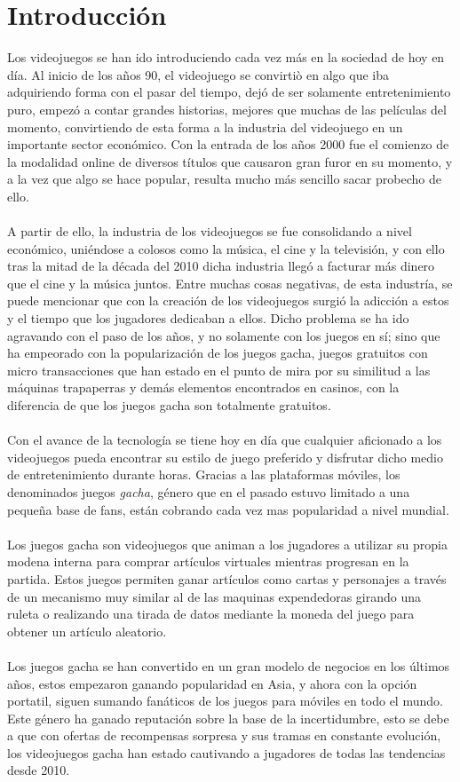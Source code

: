 \documentclass[osajnl,twocolumn,showpacs,superscriptaddress,10pt]{revtex4-2}
\begin{document}
\section{Introducción}
Los videojuegos se han ido introduciendo cada vez más en la sociedad de hoy en día. Al inicio de los años 90, el videojuego se convirtiò en algo que iba adquiriendo forma con el pasar del tiempo, dejó de ser solamente entretenimiento puro, empezó a contar grandes historias, mejores que muchas de las películas del momento, convirtiendo de esta forma a la industria del videojuego en un importante sector económico. Con la entrada de los años 2000 fue el comienzo de la modalidad online de diversos títulos que causaron gran furor en su momento, y a la vez que algo se hace popular, resulta mucho más sencillo sacar probecho de ello.
\\\\
A partir de ello, la industria de los videojuegos se fue consolidando a nivel económico, uniéndose a colosos como la música, el cine y la televisión, y con ello tras la mitad de la década del 2010 dicha industria llegó a facturar más dinero que el cine y la música juntos\cite{ONTSI}. Entre muchas cosas negativas, de esta industría, se puede mencionar que con la creación de los videojuegos surgió la adicción a estos y el tiempo que los jugadores dedicaban a ellos. Dicho problema se ha ido agravando con el paso de los años, y no solamente con los juegos en sí; sino que ha empeorado con la popularización de los juegos gacha, juegos gratuitos con micro transacciones que han estado en el punto de mira por su similitud a las máquinas trapaperras y demás elementos encontrados en casinos, con la diferencia de que los juegos gacha son totalmente gratuitos\cite{Navarro}.
\\\\
Con el avance de la tecnología se tiene hoy en día que cualquier aficionado a los videojuegos pueda encontrar su estilo de juego preferido y disfrutar dicho medio de entretenimiento durante horas. Gracias a las plataformas móviles, los denominados juegos \textit{gacha}, género que en el pasado estuvo limitado a una pequeña base de fans, están cobrando cada vez mas popularidad a nivel mundial.
\\\\
Los juegos gacha son videojuegos que animan a los jugadores a utilizar su propia modena interna para comprar artículos virtuales mientras progresan en la partida. Estos juegos permiten ganar artículos como cartas y personajes a través de un mecanismo muy similar al de las maquinas expendedoras girando una ruleta o realizando una tirada de datos mediante la moneda del juego para obtener un artículo aleatorio. \cite{gacha}
\\\\
Los juegos gacha se han convertido en un gran modelo de negocios en los últimos años, estos empezaron ganando popularidad en Asia, y ahora con la opción portatil, siguen sumando fanáticos de los juegos para móviles en todo el mundo. Este género ha ganado reputación sobre la base de la incertidumbre, esto se debe a que con ofertas de recompensas sorpresa y sus tramas en constante evolución, los videojuegos gacha han estado cautivando a jugadores de todas las tendencias desde 2010. \cite{gacha02}
\end{document}
